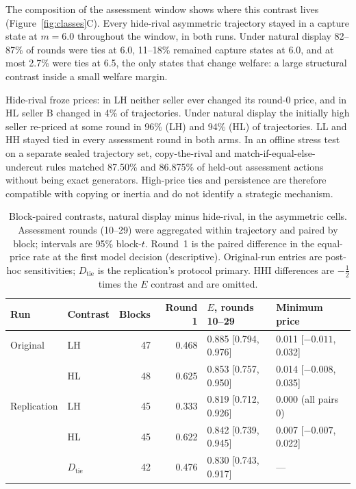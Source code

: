 \documentclass[sigconf,review,anonymous]{acmart}
\begin{document}
The composition of the assessment window shows where this contrast lives (Figure~\ref{fig:classes}C). Every hide-rival asymmetric trajectory stayed in a capture state at $m=6.0$ throughout the window, in both runs. Under natural display 82--87\% of rounds were ties at 6.0, 11--18\% remained capture states at 6.0, and at most 2.7\% were ties at 6.5, the only states that change welfare: a large structural contrast inside a small welfare margin.

Hide-rival froze prices: in LH neither seller ever changed its round-0 price, and in HL seller B changed in 4\% of trajectories. Under natural display the initially high seller re-priced at some round in 96\% (LH) and 94\% (HL) of trajectories. LL and HH stayed tied in every assessment round in both arms. In an offline stress test on a separate sealed trajectory set, copy-the-rival and match-if-equal-else-undercut rules matched 87.50\% and 86.875\% of held-out assessment actions without being exact generators. High-price ties and persistence are therefore compatible with copying or inertia and do not identify a strategic mechanism.

\begin{table}[t]
  \centering
  \caption{Block-paired contrasts, natural display minus hide-rival, in the asymmetric cells. Assessment rounds (10--29) were aggregated within trajectory and paired by block; intervals are 95\% block-$t$. Round~1 is the paired difference in the equal-price rate at the first model decision (descriptive). Original-run entries are post-hoc sensitivities; $D_{\mathrm{tie}}$ is the replication's protocol primary. HHI differences are $-\tfrac{1}{2}$ times the $E$ contrast and are omitted.}
  \label{tab:paired-structure}
  \scriptsize
  \setlength{\tabcolsep}{3pt}
  \begin{tabular}{@{}llrrll@{}}
    \toprule
    Run & Contrast & Blocks & Round 1 & $E$, rounds 10--29 & Minimum price \\
    \midrule
    Original & LH & 47 & 0.468 & 0.885 [0.794, 0.976] & 0.011 [$-0.011$, 0.032] \\
             & HL & 48 & 0.625 & 0.853 [0.757, 0.950] & 0.014 [$-0.008$, 0.035] \\
    Replication & LH & 45 & 0.333 & 0.819 [0.712, 0.926] & 0.000 (all pairs 0) \\
                & HL & 45 & 0.622 & 0.842 [0.739, 0.945] & 0.007 [$-0.007$, 0.022] \\
                & $D_{\mathrm{tie}}$ & 42 & 0.476 & 0.830 [0.743, 0.917] & --- \\
    \bottomrule
  \end{tabular}
\end{table}
\end{document}
